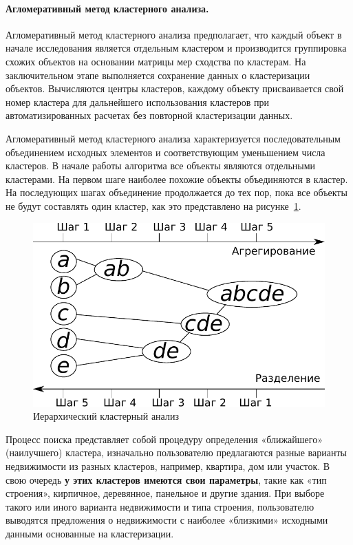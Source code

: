 \documentclass[a4paper,14pt,openany,final]{extreport} %
\begin{document}
{\paragraph{Агломеративный метод кластерного анализа.}
Агломеративный метод кластерного анализа предполагает, что каждый объект в начале исследования является отдельным кластером и производится группировка схожих объектов на основании матрицы мер сходства по кластерам. На заключительном этапе выполняется сохранение данных о кластеризации объектов. Вычисляются центры кластеров, каждому объекту присваивается свой номер кластера для дальнейшего использования кластеров при автоматизированных расчетах без повторной кластеризации данных.

Агломеративный метод кластерного анализа характеризуется последовательным объединением исходных элементов и соответствующим уменьшением числа кластеров. В начале работы алгоритма все объекты являются отдельными кластерами. На первом шаге наиболее похожие объекты объединяются в кластер. На последующих шагах объединение продолжается до тех пор, пока все объекты не будут составлять один кластер, как это представлено на рисунке~\ref{fig:hclustdescr}.

\begin{figure}[htbp]
  \centering
  \includegraphics[width=0.5\linewidth]{hclustexp.pdf}
  \caption{Иерархический кластерный анализ}
  \label{fig:hclustdescr}
\end{figure}


Процесс поиска представляет собой процедуру определения «ближайшего» (наилучшего) кластера, изначально пользователю предлагаются разные варианты недвижимости из разных кластеров, например, квартира, дом или участок. В свою очередь\textbf{ у этих кластеров имеются свои параметры}, такие как «тип строения», кирпичное, деревянное, панельное и другие здания. При выборе такого или иного варианта недвижимости и типа строения, пользователю выводятся предложения о недвижимости с наиболее «близкими» исходными данными основанные на кластеризации.

}
\end{document}
